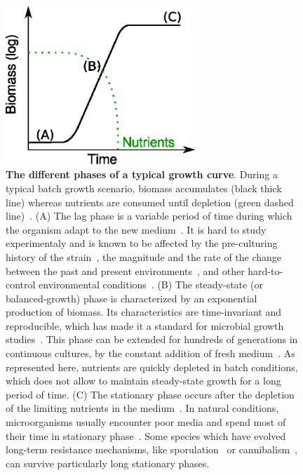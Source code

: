 \begin{figure}[p]
\centering
\includegraphics[height=6cm]{./Fig/Chapter1/growth_curve.eps}
\caption{
\textbf{The different phases of a typical growth curve}.
During a typical batch growth scenario, biomass accumulates (black thick line) whereas nutrients are consumed until depletion (green dashed line)~\cite{schaechter_microbe_2006}.
(A) The lag phase is a variable period of time during which the organism adapt to the new medium~\cite{swinnen_predictive_2004}.
It is hard to study experimentaly and is known to be affected by the pre-culturing history of the strain~\cite{ng_damage_1962,dufrenne_effect_1997,shaw_effect_1967}, the magnitude and the rate of the change between the past and present environments~\cite{mcmeekin_predictive_2002}, and other hard-to-control environmental conditions~\cite{cheroutre-vialette_application_2002}.
(B) The steady-state (or balanced-growth) phase is characterized by an exponential production of biomass.
Its characteristics are time-invariant and reproducible, which has made it a standard for microbial growth studies~\cite{schaechter_microbe_2006}.
This phase can be extended for hundreds of generations in continuous cultures, by the constant addition of fresh medium~\cite{wang_robust_2010}.
As represented here, nutrients are quickly depleted in batch conditions, which does not allow to maintain steady-state growth for a long period of time.
(C) The stationary phase occurs after the depletion of the limiting nutrients in the medium~\cite{chubukov_environmental_2014,schaechter_microbe_2006}.
In natural conditions, microorganisms usually encounter poor media and spend most of their time in stationary phase~\cite{mcarthur_microbial_2006,menge_nitrogen_2012,hobbie_microbes_2013}.
Some species which have evolved long-term resistance mechanisms, like sporulation~\cite{stragier_molecular_1996} or cannibalism~\cite{gonzalez-pastor_cannibalism:_2011}, can survive particularly long stationary phases.
}
\label{fig:growth_curve}
\end{figure}

